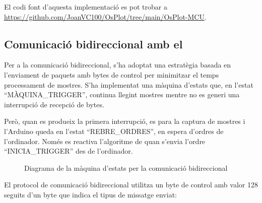 \documentclass{tfgitic}[2023/07/07]
\begin{document}
El codi font d'aquesta implementació es pot trobar a
\url{https://github.com/JoanVC100/OsPlot/tree/main/OsPlot-MCU}.

\subsection{Comunicació bidireccional amb el }

Per a la comunicació bidireccional, s'ha adoptat una estratègia basada
en l'enviament de paquets amb bytes de control per minimitzar el temps
processament de mostres. S'ha implementat una màquina d'estats que, en
l'estat ``MÀQUINA\_TRIGGER'', continua llegint mostres mentre no es
generi una interrupció de recepció de bytes.

Però, quan es produeix la primera interrupció, es para la captura de
mostres i l'Arduino queda en l'estat ``REBRE\_ORDRES'', en espera
d'ordres de l'ordinador. Només es reactiva l'algoritme de
 quan s'envia l'ordre ``INICIA\_TRIGGER'' des de
l'ordinador.

\begin{figure}[!hb]
      \centering
      \caption{Diagrama de la màquina d'estats per la comunicació bidireccional}
\end{figure}

\clearpage

El protocol de comunicació bidireccional utilitza un byte de control
amb valor \num{128} seguits d'un byte que indica el tipus de missatge
enviat:
\end{document}
